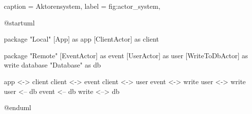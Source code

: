 \begin{dhbwfigure}{%
    caption	= Aktorensystem,
    label	= fig:actor_system,
}
\begin{plantuml}
@startuml

package "Local" {
    [App] as app
    [ClientActor] as client
}

package "Remote" {
    [EventActor] as event
    [UserActor] as user
    [WriteToDbActor] as write
    database "Database" as db
}

app <-> client
client <-> event
client <-> user
event <-> write
user <-> write
user <-- db
event <-- db
write <--> db

@enduml
\end{plantuml}
\end{dhbwfigure}
